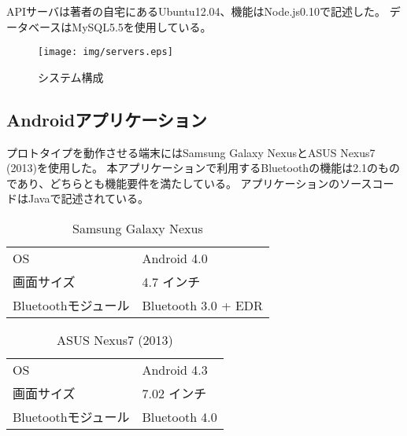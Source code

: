 APIサーバは著者の自宅にあるUbuntu12.04、機能はNode.js0.10で記述した。
データベースはMySQL5.5を使用している。

\begin{figure}[h]
    \begin{center}
        \texttt{[image: img/servers.eps]}
    \end{center}
    \caption{システム構成}
    \label{fig:servers}
\end{figure}

\newpage

\subsection{Androidアプリケーション}

プロトタイプを動作させる端末にはSamsung Galaxy NexusとASUS Nexus7 (2013)を使用した。
本アプリケーションで利用するBluetoothの機能は2.1のものであり、どちらとも機能要件を満たしている。
アプリケーションのソースコードはJavaで記述されている。


\begin{table}[hb]
    \begin{center}
    \caption{Samsung Galaxy Nexus}

    \begin{tabular}{l|l}
        \hline
        OS & Android 4.0 \\
        画面サイズ & 4.7 インチ \\
        Bluetoothモジュール & Bluetooth 3.0 + EDR \\
        \hline
    \end{tabular}
    \end{center}
\end{table}

\begin{table}[hb]
    \begin{center}
        \caption{ASUS Nexus7 (2013)}

        \begin{tabular}{l|l}
            \hline
            OS & Android 4.3 \\
            画面サイズ & 7.02 インチ \\
            Bluetoothモジュール & Bluetooth 4.0 \\
            \hline
        \end{tabular}
    \end{center}
\end{table}


